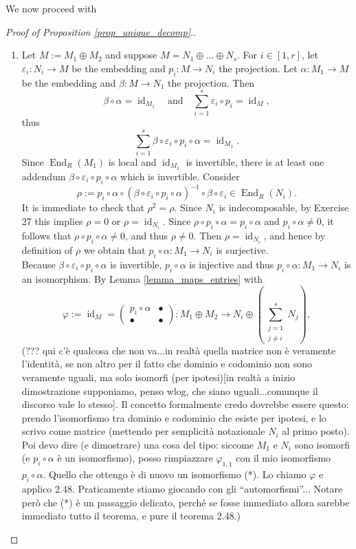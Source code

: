 \documentclass[12pt,a4paper]{report}
\theoremstyle{definition}
\theoremstyle{num.custom-title}
\DeclareMathOperator{\id}{id}
\DeclareMathOperator{\End}{End}
\renewcommand{\epsilon}{\varepsilon}
\renewcommand{\phi}{\varphi}
\begin{document}
We now proceed with
\begin{proof}[Proof of Proposition \ref{prop_unique_decomp}.]\ 
\begin{enumerate}
\item Let $M := M_1 \oplus M_2$ and suppose $M = N_1 \oplus \ldots \oplus N_s$. For $i \in [1,r]$, let $\epsilon_i : N_i \to M$ be the embedding and $p_i : M \to N_i$ the projection. Let $\alpha : M_1 \to M$ be the embedding and $\beta : M \to N_1$ the projection. Then
\[
\beta \circ \alpha = \id_{M_1} \quad \text{and} \quad \sum_{i=1}^s \epsilon_i \circ p_i = \id_M,
\]
thus
\[
\sum_{i=1}^s \beta \circ \epsilon_i \circ p_i \circ \alpha = \id_{M_1}.
\]
Since $\End_R(M_1)$ is local and $\id_{M_1}$ is invertible, there is at least one addendum $\beta \circ \epsilon_i \circ p_i \circ \alpha$ which is invertible. Consider
\[
\rho := p_i \circ \alpha \circ (\beta \circ \epsilon_i \circ p_i \circ \alpha)^{-1} \circ \beta \circ \epsilon_i \in \End_R(N_i).
\]
It is immediate to check that $\rho^2=\rho$. Since $N_i$ is indecomposable, by Exercise 27 this implies $\rho=0$ or $\rho=\id_{N_i}$. Since $\rho \circ p_i \circ \alpha = p_i \circ \alpha$ and $p_i \circ \alpha \neq 0$, it follows that $\rho \circ p_i \circ \alpha \neq 0$, and thus $\rho \neq 0$. Then $\rho=\id_{N_i}$, and hence by definition of $\rho$ we obtain that $p_i \circ \alpha : M_1 \to N_i$ is surjective.\\
Because $\beta \circ \epsilon_i \circ p_i \circ \alpha$ is invertible, $p_i \circ \alpha$ is injective and thus $p_i \circ \alpha : M_1 \to N_i$ is an isomorphism. By Lemma \ref{lemma_maps_entries} with
\[
\phi := \id_M =
\begin{pmatrix}
p_i \circ \alpha & \bullet \\
\bullet & \bullet
\end{pmatrix}
\colon M_1 \oplus M_2 \to N_i \oplus \left( \sum_{\substack{j=1 \\ j \neq i}}^s N_j \right),
\]
(??? qui c'è qualcosa che non va...in realtà quella matrice non è veramente l'identità, se non altro per il fatto che dominio e codominio non sono veramente uguali, ma solo isomorfi (per ipotesi)[in realtà a inizio dimostrazione supponiamo, penso wlog, che siano uguali...comunque il discorso vale lo stesso]. Il concetto formalmente credo dovrebbe essere questo: prendo l'isomorfismo tra dominio e codominio che esiste per ipotesi, e lo scrivo come matrice (mettendo per semplicità notazionale $N_i$ al primo posto). Poi devo dire (e dimostrare) una cosa del tipo: siccome $M_1$ e $N_i$ sono isomorfi (e $p_i \circ \alpha$ è un isomorfismo), posso rimpiazzare $\phi_{1,1}$ con il mio isomorfismo $p_i \circ \alpha$. Quello che ottengo è di nuovo un isomorfismo (*). Lo chiamo $\phi$ e applico 2.48. Praticamente stiamo giocando con gli ``automorfismi''... Notare però che (*) è un passaggio delicato, perché se fosse immediato allora sarebbe immediato tutto il teorema, e pure il teorema 2.48.)\\

\end{enumerate}
\end{proof}
\end{document}
